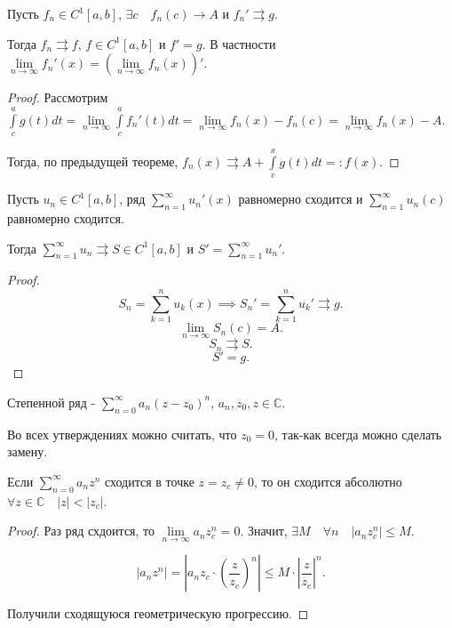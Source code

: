 \begin{theorem} \thmslashn

    Пусть $f_{n}\in C^{1}[a, b]$, $\exists{c}\quad f_{n}(c) \to A$ и $f_{n}' \rightrightarrows g$.

    Тогда $f_{n} \rightrightarrows f$, $f\in C^{1}[a, b]$ и $f' = g$. В частности $\lim\limits_{n \to \infty} f_{n}'(x) = \left( \lim\limits_{n \to \infty} f_{n}(x) \right)'$.

    \begin{proof} \thmslashn
    
        Рассмотрим $\int\limits_{c}^{a} g(t)dt = \lim\limits_{n \to \infty} \int\limits_{c}^{a} f_{n}'(t)dt = \lim\limits_{n \to \infty} f_{n}(x) - f_{n}(c) = \lim\limits_{n \to \infty} f_{n}(x) - A$.

        Тогда, по предыдущей теореме, $f_{n}(x) \rightrightarrows A + \int\limits_{c}^{x} g(t)dt =: f(x)$.
    \end{proof}
\end{theorem}
\begin{consequence} \thmslashn

    Пусть $u_{n}\in C^{1}[a, b]$, ряд $\sum\limits_{n=1}^{\infty} u_{n}'(x)$ равномерно сходится и $\sum\limits_{n=1}^{\infty} u_{n}(c)$ равномерно сходится.

    Тогда $\sum\limits_{n=1}^{\infty} u_{n} \rightrightarrows S\in C^{1}[a, b]$ и $S' = \sum\limits_{n=1}^{\infty} u_{n}'$.
    \begin{proof} \thmslashn
    
        \[ S_{n} = \sum\limits_{k=1}^{n} u_{k}(x) \implies S_{n}' = \sum\limits_{k=1}^{n} u_{k}' \rightrightarrows g .\]
        \[ \lim\limits_{n \to \infty} S_{n}(c) = A .\]
        \[ S_{n} \rightrightarrows S .\]
        \[ S' = g .\] 
    \end{proof}
\end{consequence}
\begin{definition} \thmslashn 

    Степенной ряд - $\sum\limits_{n=0}^{\infty} a_{n}(z - z_0)^{n}$, $a_{n}, z_0, z\in \mathbb{C}$.
\end{definition}

Во всех утверждениях можно считать, что $z_0 = 0$, так-как всегда можно сделать замену.

\begin{theorem} \thmslashn

    Если $\sum\limits_{n=0}^{\infty} a_{n}z^{n}$ сходится в точке $z=z_{c} \neq 0$, то он сходится абсолютно $\forall{z\in \mathbb{C}}\quad |z| < |z_{c}|$.
    \begin{proof} \thmslashn
    
        Раз ряд схдоится, то $\lim\limits_{n \to \infty} a_{n}z_{c}^{n} = 0$. Значит, $\exists{M}\quad \forall{n}\quad |a_{n}z_{c}^{n}| \le M $. 

        \[ |a_{n}z^{n}| = \left|a_{n}z_{c} \cdot \left( \frac{z}{z_c} \right)^{n}\right| \le M \cdot \left| \frac{z}{z_{c}}\right|^{n} .\]

        Получили сходящуюся геометрическую прогрессию.
    \end{proof}
\end{theorem}

